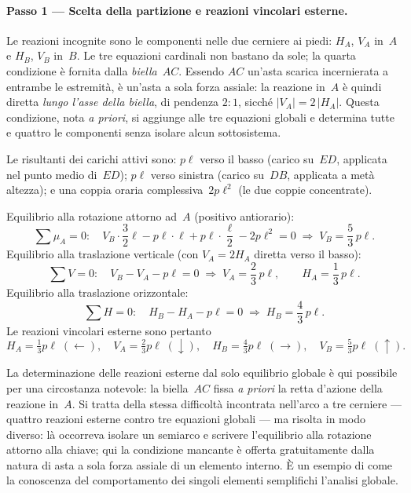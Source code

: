 \paragraph{Passo 1 --- Scelta della partizione e
	reazioni vincolari esterne.}

Le reazioni incognite sono le componenti nelle due
cerniere ai piedi: $H_A$, $V_A$ in~$A$ e $H_B$, $V_B$
in~$B$. Le tre equazioni cardinali non bastano da sole;
la quarta condizione è fornita dalla \emph{biella}~$AC$.
Essendo $AC$ un'asta scarica incernierata a entrambe le
estremità, è un'asta a sola forza assiale: la reazione
in~$A$ è quindi diretta \emph{lungo l'asse della biella},
di pendenza $2{:}1$, sicché $|V_A| = 2\,|H_A|$. Questa
condizione, nota \emph{a priori}, si aggiunge alle tre
equazioni globali e determina tutte e quattro le componenti
senza isolare alcun sottosistema.

Le risultanti dei carichi attivi sono: $p\ell$ verso il
basso (carico su~$ED$, applicata nel punto medio di~$ED$);
$p\ell$ verso sinistra (carico su~$DB$, applicata a metà
altezza); e una coppia oraria complessiva~$2p\ell^2$ (le due
coppie concentrate).

\medskip
\noindent Equilibrio alla rotazione attorno ad~$A$
(positivo antiorario):
\[
\sum \mu_A = 0:\quad
V_B\cdot\frac{3}{2}\ell
- p\ell\cdot\ell
+ p\ell\cdot\frac{\ell}{2}
- 2p\ell^2 = 0
\;\Rightarrow\;
V_B = \frac{5}{3}\,p\ell .
\]
\noindent Equilibrio alla traslazione verticale (con
$V_A = 2H_A$ diretta verso il basso):
\[
\sum V = 0:\quad
V_B - V_A - p\ell = 0
\;\Rightarrow\;
V_A = \frac{2}{3}\,p\ell,
\qquad
H_A = \frac{1}{3}\,p\ell .
\]
\noindent Equilibrio alla traslazione orizzontale:
\[
\sum H = 0:\quad
H_B - H_A - p\ell = 0
\;\Rightarrow\;
H_B = \frac{4}{3}\,p\ell .
\]
Le reazioni vincolari esterne sono pertanto
\[
H_A = \tfrac{1}{3}p\ell \;(\leftarrow),\quad
V_A = \tfrac{2}{3}p\ell \;(\downarrow),\quad
H_B = \tfrac{4}{3}p\ell \;(\rightarrow),\quad
V_B = \tfrac{5}{3}p\ell \;(\uparrow).
\]

\begin{oss}
	La determinazione delle reazioni esterne dal solo
	equilibrio globale è qui possibile per una circostanza
	notevole: la biella~$AC$ fissa \emph{a priori} la
	retta d'azione della reazione in~$A$. Si tratta della
	stessa difficoltà incontrata nell'arco a tre cerniere
	--- quattro reazioni esterne contro tre equazioni globali
	--- ma risolta in modo diverso: là occorreva isolare un
	semiarco e scrivere l'equilibrio alla rotazione attorno
	alla chiave; qui la condizione mancante è offerta
	gratuitamente dalla natura di asta a sola forza assiale
	di un elemento interno. È un esempio di come la
	conoscenza del comportamento dei singoli elementi
	semplifichi l'analisi globale.
\end{oss}


